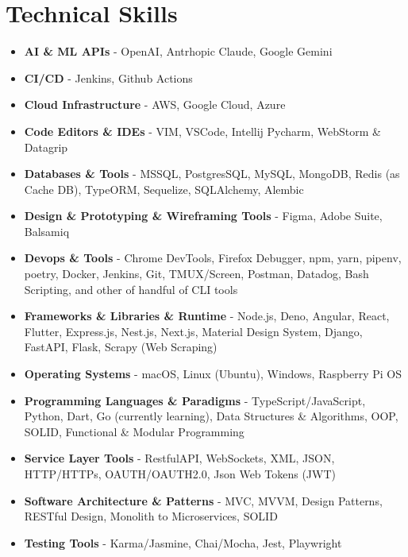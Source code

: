 \section{Technical Skills}
{
	\normalsize
	\begin{itemize}[topsep=0pt, partopsep=0pt, itemsep=0pt, parsep=0pt]
		\item \textbf{AI \& ML APIs} - OpenAI, Antrhopic Claude, Google Gemini
		\item \textbf{CI/CD} - Jenkins, Github Actions
		\item \textbf{Cloud Infrastructure} - AWS, Google Cloud, Azure
		\item \textbf{Code Editors \& IDEs} - VIM, VSCode, Intellij Pycharm, WebStorm \& Datagrip
		\item \textbf{Databases \& Tools} - MSSQL, PostgresSQL, MySQL, MongoDB, Redis (as Cache DB), TypeORM, Sequelize, SQLAlchemy, Alembic
		\item \textbf{Design \& Prototyping \& Wireframing Tools} - Figma, Adobe Suite, Balsamiq
		\item \textbf{Devops \& Tools} - Chrome DevTools, Firefox Debugger, npm, yarn, pipenv, poetry, Docker, Jenkins, Git, TMUX/Screen, Postman, Datadog, Bash Scripting, and other of handful of CLI tools
		\item \textbf{Frameworks \& Libraries \& Runtime} - Node.js, Deno, Angular, React, Flutter, Express.js, Nest.js, Next.js, Material Design System, Django, FastAPI, Flask, Scrapy (Web Scraping)
		\item \textbf{Operating Systems} - macOS, Linux (Ubuntu), Windows, Raspberry Pi OS
		\item \textbf{Programming Languages \& Paradigms} - TypeScript/JavaScript, Python, Dart, Go (currently learning), Data Structures \& Algorithms, OOP, SOLID, Functional \& Modular Programming
		\item \textbf{Service Layer Tools} - RestfulAPI, WebSockets, XML, JSON, HTTP/HTTPs, OAUTH/OAUTH2.0, Json Web Tokens (JWT)
		\item \textbf{Software Architecture \& Patterns} - MVC, MVVM, Design Patterns, RESTful Design, Monolith to Microservices, SOLID
		\item \textbf{Testing Tools} - Karma/Jasmine, Chai/Mocha, Jest, Playwright
	\end{itemize}
}